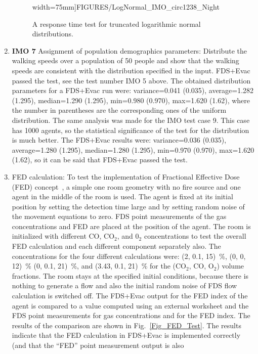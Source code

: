 \documentclass[12pt,a4paper,final,twoside]{stylevk}
\begin{document}
\begin{enumerate}
\begin{figure}[!tb]
{  width=75mm]{FIGURES/LogNormal_IMO_circ1238_Night}}   
  \caption{A response time test for truncated logarithmic normal
  distributions.}\label{Fig_IMOLogNormal} 
\end{figure}
%
%
\item \textbf{IMO 7} Assignment of population demographics parameters:
  Distribute the walking speeds over a population of 50 people and
  show that the walking speeds are consistent with the distribution
  specified in the input.  FDS+Evac passed the test, see the test
  number IMO 5 above.  The obtained distribution parameters for a
  FDS+Evac run were: variance=0.041 (0.035), average=1.282 (1.295),
  median=1.290 (1.295), min=0.980 (0.970), max=1.620 (1.62), where the
  number in parentheses are the corresponding ones of the uniform
  distribution.  The same analysis was made for the IMO test case 9.
  This case has 1000 agents, so the statistical significance of the
  test for the distribution is much better.  The FDS+Evac results
  were: variance=0.036 (0.035), average=1.280 (1.295), median=1.280
  (1.295), min=0.970 (0.970), max=1.620 (1.62), so it can be said that
  FDS+Evac passed the test.
%
\item FED calculation: To test the implementation of Fractional
  Effective Dose (FED) concept~\cite{Purser03}, a simple one room
  geometry with no fire source and one agent in the middle of the room
  is used.  The agent is fixed at its initial position by setting the
  detection time large and by setting random noise of the movement
  equations to zero.  FDS point measurements of the gas concentrations
  and FED are placed at the position of the agent.  The room is
  initialized with different CO, CO${}_2$, and 0${}_2$ concentrations
  to test the overall FED calculation and each different component
  separately also.  The concentrations for the four different
  calculations were: (2, 0.1, 15)~\%, (0, 0, 12)~\% (0, 0.1, 21)~\%,
  and (3.43, 0.1, 21)~\% for the (CO${}_2$, CO, O${}_2$) volume
  fractions.  The room stays at the specified initial conditions,
  because there is nothing to generate a flow and also the initial
  random noise of FDS flow calculation is switched off.  The FDS+Evac
  output for the FED index of the agent is compared to a value
  computed using an external worksheet and the FDS point measurements
  for gas concentrations and for the FED index.  The results of the
  comparison are shown in Fig.~\ref{Fig_FED_Test}.  The results
  indicate that the FED calculation in FDS+Evac is implemented
  correctly (and that the ``FED'' point measurement output is also

\end{enumerate}
\end{document}
